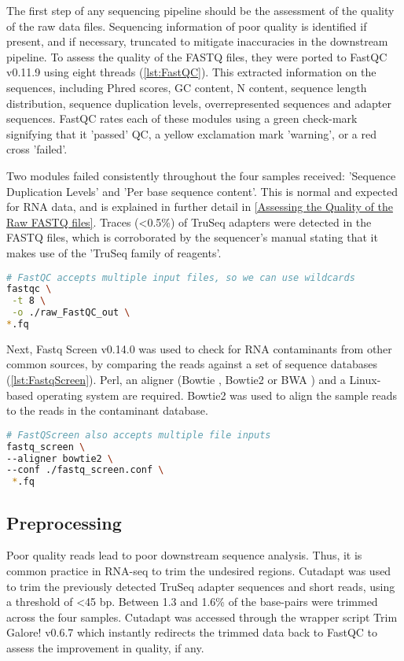 The first step of any sequencing pipeline should be the assessment of the quality of the raw data files. Sequencing information of poor quality is identified if present, and if necessary, truncated to mitigate inaccuracies in the downstream pipeline. To assess the quality of the FASTQ files, they were ported to FastQC v0.11.9 \citep{andrews2010fastqc} using eight threads (\autoref{lst:FastQC}). This extracted information on the sequences, including Phred scores, GC content, N content, sequence length distribution, sequence duplication levels, overrepresented sequences and adapter sequences. FastQC rates each of these modules using a green check-mark signifying that it 'passed' QC, a yellow exclamation mark 'warning', or a red cross 'failed'. 

Two modules failed consistently throughout the four samples received: 'Sequence Duplication Levels' and 'Per base sequence content'. This is normal and expected for RNA data, and is explained in further detail in \autoref{Assessing the Quality of the Raw FASTQ files}. Traces (<0.5\%) of TruSeq adapters were detected in the FASTQ files, which is corroborated by the sequencer's manual \citep{HiSeq2000} stating that it makes use of the 'TruSeq family of reagents'. 

\begin{lstlisting}[language=bash, caption=FastQC command, label={lst:FastQC}]
# FastQC accepts multiple input files, so we can use wildcards
fastqc \
 -t 8 \
 -o ./raw_FastQC_out \
*.fq 
\end{lstlisting}

Next, Fastq Screen v0.14.0 \citep{wingett2018fastq} was used to check for RNA contaminants from other common sources, by comparing the reads against a set of sequence databases (\autoref{lst:FastqScreen}). Perl, an aligner (Bowtie \citep{bowtie}, Bowtie2 \citep{bowtie2} or BWA \citep{bwa}) and a Linux-based operating system are required. Bowtie2 was used to align the sample reads to the reads in the contaminant database.

\begin{lstlisting}[language=bash, caption=FastqScreen command, label={lst:FastqScreen}]
# FastQScreen also accepts multiple file inputs
fastq_screen \
--aligner bowtie2 \
--conf ./fastq_screen.conf \
 *.fq 
\end{lstlisting}


\subsection{Preprocessing}%
Poor quality reads lead to poor downstream sequence analysis. Thus, it is common practice in RNA-seq to trim the undesired regions. Cutadapt \citep{martin2011cutadapt} was used to trim the previously detected TruSeq adapter sequences and short reads, using a threshold of <45 bp. Between 1.3 and 1.6\% of the base-pairs were trimmed across the four samples. Cutadapt was accessed through the wrapper script Trim Galore! v0.6.7 \citep{trimgalore} which instantly redirects the trimmed data back to FastQC to assess the improvement in quality, if any.

